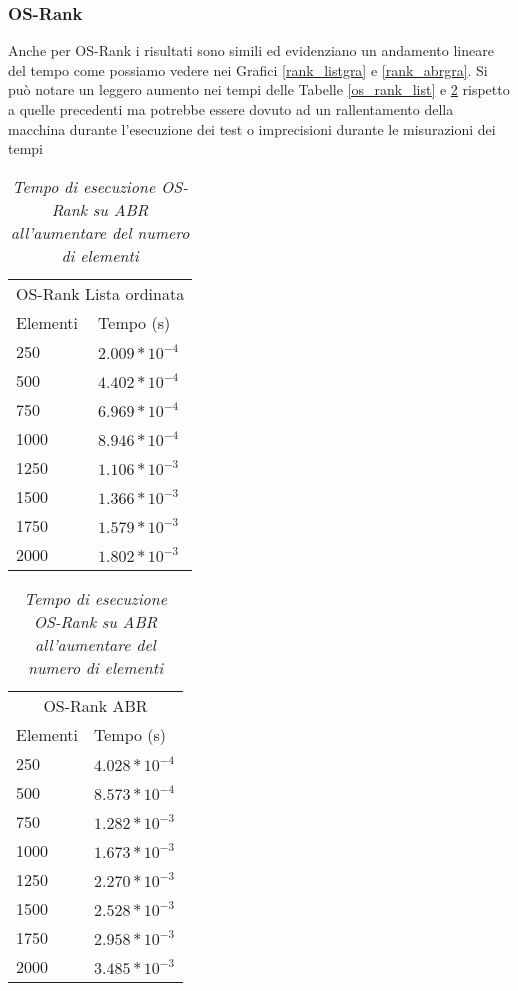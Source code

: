 \documentclass{article}
\begin{document}
\subsubsection{OS-Rank}
Anche per OS-Rank i risultati sono simili ed evidenziano un andamento lineare del tempo come possiamo vedere nei Grafici \ref{rank_listgra} e \ref{rank_abrgra}.
Si può notare un leggero aumento nei tempi delle Tabelle \ref{os_rank_list} e \ref{os_rank_ABR} rispetto a quelle precedenti ma potrebbe essere dovuto ad un rallentamento della macchina durante l'esecuzione dei test o imprecisioni durante le misurazioni dei tempi
\begin{table}[H]
    \begin{minipage}{.5\linewidth}
    \centering
    \begin{tabular}{l | l}
    \multicolumn{2}{c}{OS-Rank Lista ordinata} \\[0.5ex]
    Elementi & Tempo (s)\\ [0.5ex]
    \hline \hline
    250 & $2.009*10^{-4}$ \\
    500 & $4.402*10^{-4}$ \\
    750 & $6.969*10^{-4}$ \\
    1000 & $8.946*10^{-4}$ \\
    1250 & $1.106*10^{-3}$ \\
    1500 & $1.366*10^{-3}$ \\
    1750 & $1.579*10^{-3}$ \\
    2000 & $1.802*10^{-3}$ \\
\end{tabular}
      \caption{\textit{Tempo di esecuzione OS-Rank su lista ordinata all'aumentare del numero di elementi}}
      \label{os_rank_list}
    \end{minipage}%
    \hspace{10pt}
    \begin{minipage}{.5\linewidth}
      \centering
        \begin{tabular}{l | l}
        \multicolumn{2}{c}{OS-Rank ABR} \\[0.5ex]
    Elementi & Tempo (s)\\ [0.5ex]
    \hline \hline
    250 & $4.028*10^{-4}$ \\
    500 & $8.573*10^{-4}$ \\
    750 & $1.282*10^{-3}$ \\
    1000 & $1.673*10^{-3}$ \\
    1250 & $2.270*10^{-3}$ \\
    1500 & $2.528*10^{-3}$ \\
    1750 & $2.958*10^{-3}$ \\
    2000 & $3.485*10^{-3}$ \\
\end{tabular}
        \caption{\textit{Tempo di esecuzione OS-Rank su ABR all'aumentare del numero di elementi}}
        \label{os_rank_ABR}
    \end{minipage} 
\end{table}
\end{document}

